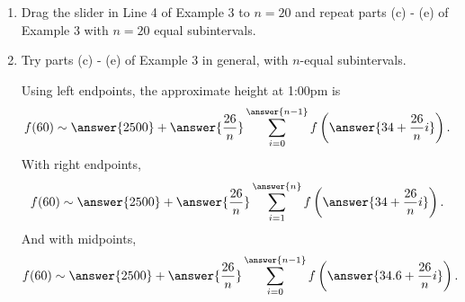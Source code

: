 \documentclass{ximera}
\begin{document}
\begin{example}  \label{Ex:IjdRJrehreDF}
\begin{enumerate}
\item  Drag the slider in Line 4 of Example 3 to $n=20$ and repeat parts (c) - (e) of Example 3 with $n=20$ equal subintervals. 

\item Try parts (c) - (e) of Example 3 in general, with $n$-equal subintervals.

Using left endpoints, the approximate height at 1:00pm is
\[
        f(60) \sim   \answer{2500} +  \answer{\frac{26}{n}} \sum_{i=0}^{\answer{n-1}} f\left(\answer{34+ \frac{26}{n}i}\right)  .
\]
With right endpoints,
\[
        f(60) \sim   \answer{2500} +  \answer{\frac{26}{n}} \sum_{i=1}^{\answer{n}} f\left(\answer{34+ \frac{26}{n}i}\right)  .
\]
And with midpoints,
\[
        f(60) \sim   \answer{2500} +  \answer{\frac{26}{n}} \sum_{i=0}^{\answer{n-1}} f\left(\answer{34.6+ \frac{26}{n}i}\right)  .
\]

\end{enumerate}
\end{example}
\end{document}
